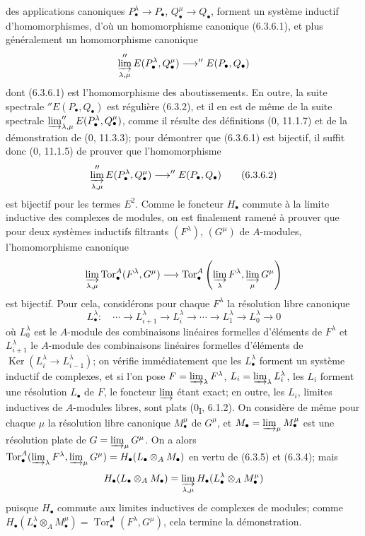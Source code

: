 
des applications canoniques $P_\bullet^\lambda\to P_\bullet$,
$Q_\bullet^\mu\to Q_\bullet$, forment un système inductif d'homomorphismes,
d'où un homomorphisme canonique (6.3.6.1), et plus généralement un
homomorphisme canonique
\[
  \varinjlim_{\lambda,\mu}''E(P_\bullet^\lambda,Q_\bullet^\mu)
  \longrightarrow ''E(P_\bullet,Q_\bullet)
\]
dont (6.3.6.1) est l'homomorphisme des aboutissements. En outre, la suite
spectrale $''E(P_\bullet,Q_\bullet)$ est régulière (6.3.2), et il en est de
même de la suite spectrale
$\varinjlim_{\lambda,\mu}''E(P_\bullet^\lambda,Q_\bullet^\mu)$, comme il
résulte des définitions (0, 11.1.7) et de la démonstration de (0, 11.3.3);
pour démontrer que (6.3.6.1) est bijectif, il suffit donc (0, 11.1.5) de
prouver que l'homomorphisme
\[
  \varinjlim_{\lambda,\mu}''E(P_\bullet^\lambda,Q_\bullet^\mu)
  \longrightarrow ''E(P_\bullet,Q_\bullet)
  \tag{6.3.6.2}\label{III.6.3.6.2.fr}
\]
est bijectif pour les termes $E^2$. Comme le foncteur $H_\bullet$ commute à
la limite inductive des complexes de modules, on est finalement ramené à
prouver que pour deux systèmes inductifs filtrants $(F^\lambda)$,
$(G^\mu)$ de $A$-modules, l'homomorphisme canonique
\[
  \varinjlim_{\lambda,\mu}\operatorname{Tor}_\bullet^A(F^\lambda,G^\mu)
  \longrightarrow
  \operatorname{Tor}_\bullet^A
  \left(\varinjlim_\lambda F^\lambda,
        \varinjlim_\mu G^\mu\right)
\]
est bijectif. Pour cela, considérons pour chaque $F^\lambda$ la résolution
libre canonique
\[
  L_\bullet^\lambda:\quad
  \cdots\longrightarrow L_{i+1}^\lambda
  \longrightarrow L_i^\lambda\longrightarrow\cdots
  \longrightarrow L_1^\lambda\longrightarrow L_0^\lambda\longrightarrow0
\]
où $L_0^\lambda$ est le $A$-module des combinaisons linéaires formelles
d'éléments de $F^\lambda$ et $L_{i+1}^\lambda$ le $A$-module des combinaisons
linéaires formelles d'éléments de
$\operatorname{Ker}(L_i^\lambda\to L_{i-1}^\lambda)$; on vérifie
immédiatement que les $L_\bullet^\lambda$ forment un système inductif de
complexes, et si l'on pose
$F=\varinjlim_\lambda F^\lambda$, $L_i=\varinjlim_\lambda L_i^\lambda$, les
$L_i$ forment une résolution $L_\bullet$ de $F$, le foncteur
$\varinjlim$ étant exact; en outre, les $L_i$, limites inductives de
$A$-modules libres, sont plats (0\textsubscript{I}, 6.1.2). On considère de
même pour chaque $\mu$ la résolution libre canonique $M_\bullet^\mu$ de
$G^\mu$, et $M_\bullet=\varinjlim_\mu M_\bullet^\mu$ est une résolution plate
de $G=\varinjlim_\mu G^\mu$. On a alors
$\operatorname{Tor}_\bullet^A(\varinjlim_\lambda F^\lambda,
\varinjlim_\mu G^\mu)=H_\bullet(L_\bullet\otimes_A M_\bullet)$ en vertu de
(6.3.5) et (6.3.4); mais
\[
  H_\bullet(L_\bullet\otimes_A M_\bullet)
  =\varinjlim_{\lambda,\mu}
   H_\bullet(L_\bullet^\lambda\otimes_A M_\bullet^\mu)
\]
puisque $H_\bullet$ commute aux limites inductives de complexes de modules;
comme $H_\bullet(L_\bullet^\lambda\otimes_A M_\bullet^\mu)
=\operatorname{Tor}_\bullet^A(F^\lambda,G^\mu)$, cela termine la
démonstration.

